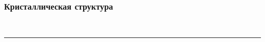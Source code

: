 \begin{frame}
	\frametitle{Кристаллическая структура}
	\centering
	\begin{minipage}[t]{0.25\linewidth}
	\end{minipage}
	\begin{minipage}[t]{0.25\linewidth}
	\end{minipage}
	\\
	\begin{minipage}[t]{0.15\linewidth}
	\end{minipage}
	\begin{minipage}[t]{0.15\linewidth}
	\end{minipage}
	\begin{minipage}[t]{0.15\linewidth}
	\end{minipage}
	\begin{minipage}[t]{0.15\linewidth}
	\end{minipage}
	\begin{minipage}[t]{0.15\linewidth}
	\end{minipage}
	\bigskip
	\hrule{}
	\bigskip
	\begin{minipage}[t]{0.25\linewidth}
	\end{minipage}
	\begin{minipage}[t]{0.25\linewidth}
	\end{minipage}
	\\
	\begin{minipage}[t]{0.2\linewidth}
	\end{minipage}
	\begin{minipage}[t]{0.2\linewidth}
	\end{minipage}
	\begin{minipage}[t]{0.2\linewidth}
	\end{minipage}
\end{frame}

